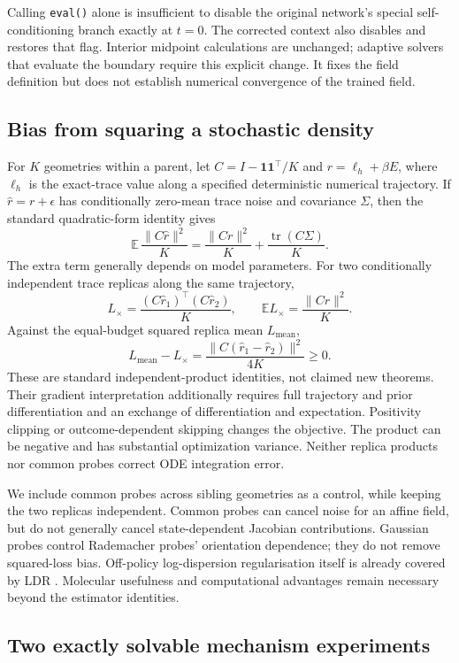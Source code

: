 Calling \texttt{eval()} alone is insufficient to disable the original network's special
self-conditioning branch exactly at $t=0$. The corrected context also disables and restores
that flag. Interior midpoint calculations are unchanged; adaptive solvers that evaluate the
boundary require this explicit change. It fixes the field definition but does not establish
numerical convergence of the trained field.

\subsection{Bias from squaring a stochastic density}

For $K$ geometries within a parent, let $C=I-\mathbf1\mathbf1^\top/K$ and
$r=\ell_h+\beta E$, where $\ell_h$ is the exact-trace value along a specified deterministic
numerical trajectory. If $\widehat r=r+\epsilon$ has conditionally zero-mean trace noise and
covariance $\Sigma$, then the standard quadratic-form identity gives
\[
 \mathbb E\,\frac{\|C\widehat r\|^2}{K}
 =\frac{\|Cr\|^2}{K}+\frac{\operatorname{tr}(C\Sigma)}{K}.
\]
The extra term generally depends on model parameters. For two conditionally independent trace
replicas along the same trajectory,
\[
 L_\times=\frac{(C\widehat r_1)^\top(C\widehat r_2)}{K},\qquad
 \mathbb E L_\times=\frac{\|Cr\|^2}{K}.
\]
Against the equal-budget squared replica mean $L_{\mathrm{mean}}$,
\[
 L_{\mathrm{mean}}-L_\times
 =\frac{\|C(\widehat r_1-\widehat r_2)\|^2}{4K}\ge0.
\]
These are standard independent-product identities, not claimed new theorems. Their gradient
interpretation additionally requires full trajectory and prior differentiation and an exchange
of differentiation and expectation. Positivity clipping or outcome-dependent skipping changes
the objective. The product can be negative and has substantial optimization variance.
Neither replica products nor common probes correct ODE integration error.

We include common probes across sibling geometries as a control, while keeping the two replicas
independent. Common probes can cancel noise for an affine field, but do not generally cancel
state-dependent Jacobian contributions. Gaussian probes control Rademacher probes' orientation
dependence; they do not remove squared-loss bias. Off-policy log-dispersion regularisation itself
is already covered by LDR \citep{ldr2026}. Molecular usefulness and computational advantages
remain necessary beyond the estimator identities.

\subsection{Two exactly solvable mechanism experiments}

